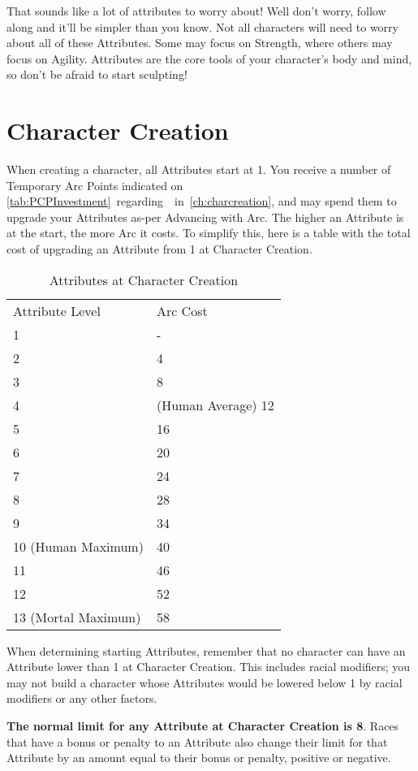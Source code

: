\documentclass[oneside,11pt,english]{book}
\begin{document}
That sounds like a lot of attributes to worry about! Well don't worry, follow along and it'll be simpler than 
you know. Not all characters will need to worry about all of these Attributes. Some may focus on 
Strength, where others may focus on Agility. Attributes are the core tools of your character’s body and 
mind, so don't be afraid to start sculpting! 
\section{Character Creation}
When creating a character, all Attributes start at 1. You receive a number of Temporary Arc Points 
indicated on \autoref{tab:PCPInvestment}~regarding~~in~\autoref{ch:charcreation}, and may spend them to upgrade your 
Attributes as-per Advancing with Arc. The higher an Attribute is at the start, the more Arc it costs. To 
simplify this, here is a table with the total cost of upgrading an Attribute from 1 at Character Creation. 
\begin{table}
	\caption{Attributes at Character Creation}
	\label{tab:AttributesatCharCreation}
\begin{tabu} to \textwidth {X[c]l}
Attribute Level&Arc Cost\\
1&-\\ 
2&4\\ 
3&8\\ 
4&(Human Average) 12\\
5&16\\ 
6&20\\ 
7&24\\ 
8&28\\ 
9&34\\ 
10 (Human Maximum)&40 \\
11&46\\
12&52\\
13 (Mortal Maximum)&58\\ 
\end{tabu}
\end{table}
When determining starting Attributes, remember that no character can have an Attribute lower than 1 at 
Character Creation. This includes racial modifiers; you may not build a character whose Attributes would 
be lowered below 1 by racial modifiers or any other factors. 


\textbf{The normal limit for any Attribute at Character Creation is 8}. Races that have a bonus or penalty to an 
Attribute also change their limit for that Attribute by an amount equal to their bonus or penalty, positive 
or negative. 
 
\end{document}
